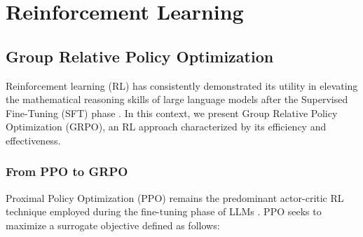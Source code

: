 \section{Reinforcement Learning}

\subsection{Group Relative Policy Optimization} Reinforcement learning (RL) has consistently demonstrated its utility in elevating the mathematical reasoning skills of large language models after the Supervised Fine-Tuning (SFT) phase \citep{wang2023math,wizardmath}. In this context, we present Group Relative Policy Optimization (GRPO), an RL approach characterized by its efficiency and effectiveness.

\subsubsection{From PPO to GRPO} Proximal Policy Optimization (PPO) \citep{schulman2017proximal} remains the predominant actor-critic RL technique employed during the fine-tuning phase of LLMs \citep{ouyang2022training}. PPO seeks to maximize a surrogate objective defined as follows:

